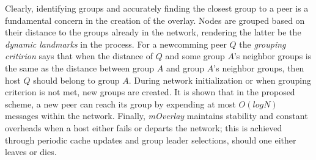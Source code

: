 Clearly, identifying groups and accurately finding the closest group 
to a peer is a fundamental concern in the creation of the overlay.
Nodes are grouped based on their distance to 
the groups already in the network, rendering
the latter be the \emph{dynamic landmarks} in the process. For a newcomming
peer $Q$ the \emph{grouping critirion} says that when the distance of $Q$ and
some group $A$’s neighbor groups is the same as the distance
between group $A$ and group $A$’s neighbor groups, then host $Q$
should belong to group $A$. During network initialization or when grouping
criterion is not met, new groups are created.
It is shown that in the proposed scheme, a new peer can 
reach its group by expending at most $O(logN)$ messages
within the network. 
Finally, \emph{mOverlay} maintains stability and constant 
overheads when a host either fails or departs the network;
this is achieved through periodic cache updates and group 
leader selections, should one either leaves or dies.
%
%
